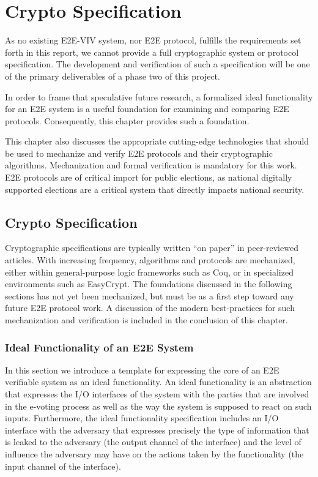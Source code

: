 \chapter{Crypto Specification}
\label{chapter:crypto_spec}

As no existing E2E-VIV system, nor E2E protocol, fulfills the
requirements set forth in this report, we cannot provide a full
cryptographic system or protocol specification.  The development and
verification of such a specification will be one of the primary
deliverables of a phase two of this project.

In order to frame that speculative future research, a formalized ideal
functionality for an E2E system is a useful foundation for examining
and comparing E2E protocols. Consequently, this chapter provides such
a foundation.  

This chapter also discusses the appropriate cutting-edge technologies
that should be used to mechanize and verify E2E protocols and their
cryptographic algorithms. Mechanization and formal verification is
mandatory for this work. E2E protocols are of critical import for
public elections, as national digitally supported elections are a
critical system that directly impacts national security.

\section{Crypto Specification}

Cryptographic specifications are typically written ``on paper'' in
peer-reviewed articles. With increasing frequency, algorithms and
protocols are mechanized, either within general-purpose logic
frameworks such as Coq, or in specialized environments such as
EasyCrypt. The foundations discussed in the following sections has not
yet been mechanized, but must be as a first step toward any future E2E
protocol work. A discussion of the modern best-practices for such
mechanization and verification is included in the conclusion of this
chapter.

\subsection{Ideal Functionality of an E2E System}

In this section we introduce a template for expressing the core of an
E2E verifiable system as an ideal functionality. An ideal
functionality is an abstraction that expresses the I/O interfaces of
the system with the parties that are involved in the e-voting process
as well as the way the system is supposed to react on such
inputs. Furthermore, the ideal functionality specification includes an
I/O interface with the adversary that expresses precisely the type of
information that is leaked to the adversary (the output channel of the
interface) and the level of influence the adversary may have on the
actions taken by the functionality (the input channel of the
interface).

